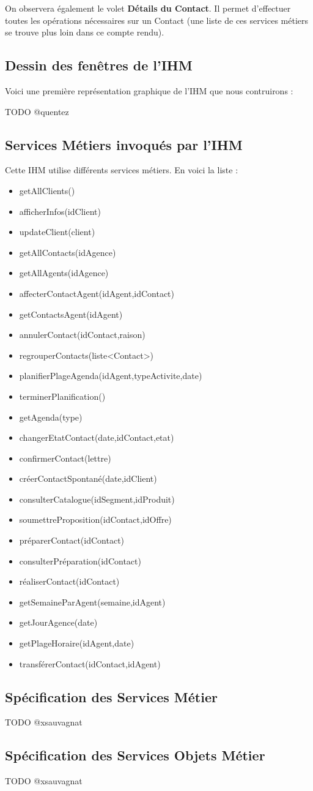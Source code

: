 On observera également le volet \textbf{Détails du Contact}. Il permet d'effectuer toutes les
opérations nécessaires sur un Contact (une liste de ces services métiers se trouve plus loin
dans ce compte rendu).

\subsection{Dessin des fenêtres de l'IHM}

Voici une première représentation graphique de l'IHM que nous contruirons :

TODO @quentez

\subsection{Services Métiers invoqués par l'IHM}

Cette IHM utilise différents services métiers. En voici la liste :

\begin{itemize}
\item getAllClients()
\item afficherInfos(idClient)
\item updateClient(client)
\item getAllContacts(idAgence)
\item getAllAgents(idAgence)
\item affecterContactAgent(idAgent,idContact)
\item getContactsAgent(idAgent)
\item annulerContact(idContact,raison)
\item regrouperContacts(liste<Contact>)
\item planifierPlageAgenda(idAgent,typeActivite,date)
\item terminerPlanification()
\item getAgenda(type)
\item changerEtatContact(date,idContact,etat)
\item confirmerContact(lettre)
\item créerContactSpontané(date,idClient)
\item consulterCatalogue(idSegment,idProduit)
\item soumettreProposition(idContact,idOffre)
\item préparerContact(idContact)
\item consulterPréparation(idContact)
\item réaliserContact(idContact)
\item getSemaineParAgent(semaine,idAgent)
\item getJourAgence(date)
\item getPlageHoraire(idAgent,date)
\item transférerContact(idContact,idAgent)
\end{itemize}

\subsection{Spécification des Services Métier}

TODO @xsauvagnat

\subsection{Spécification des Services Objets Métier}

TODO @xsauvagnat
